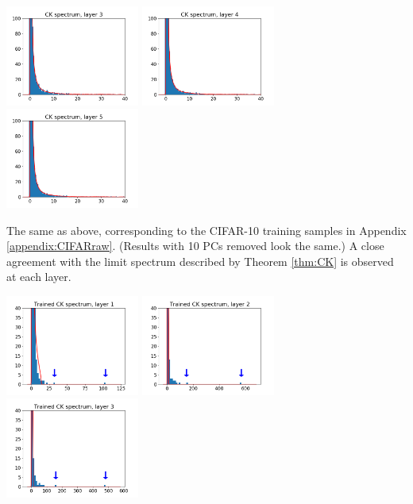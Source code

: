 \documentclass{article}
\theoremstyle{definition}
\newcommand{\1}{\mathbf{1}}
\begin{document}
\includegraphics[width=0.33\textwidth]{figures/CIFAR_raw_X3.png}%
\includegraphics[width=0.33\textwidth]{figures/CIFAR_raw_X4.png}%
\includegraphics[width=0.33\textwidth]{figures/CIFAR_raw_X5.png}%

The same as above, corresponding to the CIFAR-10 training samples in Appendix
\ref{appendix:CIFARraw}. (Results with 10 PCs removed look the same.)
A close agreement with the limit spectrum described by Theorem
\ref{thm:CK} is observed at each layer.

\includegraphics[width=0.33\textwidth]{figures/trained_X1.png}%
\includegraphics[width=0.33\textwidth]{figures/trained_X2.png}%
\includegraphics[width=0.33\textwidth]{figures/trained_X3.png}%
\end{document}
